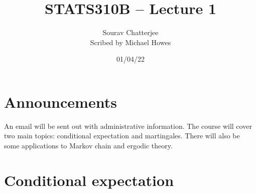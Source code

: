 




\title{STATS310B -- Lecture 1}
\author{Sourav Chatterjee\\ Scribed by Michael Howes}
\date{01/04/22}

\pagestyle{fancy}
\fancyhf{}


\maketitle
\tableofcontents
\section{Announcements}
An email will be sent out with administrative information. The course will cover two main topics: conditional expectation and martingales. There will also be some applications to Markov chain and ergodic theory.
\section{Conditional expectation}

